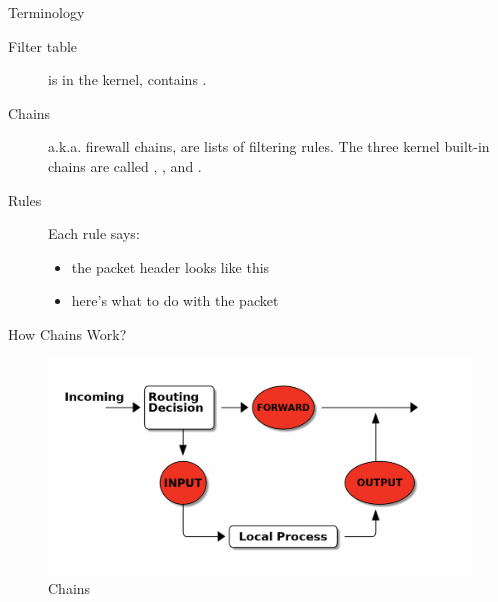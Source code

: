 \documentclass{wx672beamer}
\begin{document}
\begin{frame}{Terminology}
  \begin{description}
  \item[Filter table] is in the kernel, contains .
  \item[Chains] a.k.a. firewall chains, are lists of filtering rules. The three kernel
    built-in chains are called , , and .
  \item[Rules] Each rule says:
    \begin{itemize}
    \item[\code{if}] the packet header looks like this
    \item[\code{then}] here's what to do with the packet
    \end{itemize}
  \end{description}
\end{frame}

\begin{frame}{How Chains Work?}
  \begin{figure}
    \centering
    \includegraphics[width=\textwidth]{Chains}
    \caption{Chains}
    \label{fig:chains}
  \end{figure}
\end{frame}
\end{document}
